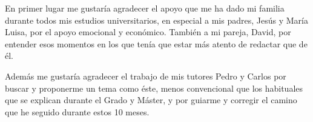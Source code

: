 En primer lugar me gustaría agradecer el apoyo que me ha dado mi familia durante todos mis estudios universitarios, en especial a mis padres, Jesús y María Luisa, por el apoyo emocional y económico. También a mi pareja, David, por entender esos momentos en los que tenía que estar más atento de redactar que de él.

Además me gustaría agradecer el trabajo de mis tutores Pedro y Carlos por buscar y proponerme un tema como éste, menos convencional que los habituales que se explican durante el Grado y Máster, y por guiarme y corregir el camino que he seguido durante estos 10 meses.